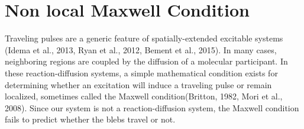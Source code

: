 \section{Non local Maxwell Condition}

Traveling pulses are a generic feature of spatially-extended excitable systems (Idema et al., 2013, Ryan et al., 2012, Bement et al., 2015). In many cases, neighboring regions are coupled by the diffusion of a molecular participant. In these reaction-diffusion systems, a simple mathematical condition exists for determining whether an excitation will induce a traveling pulse or remain localized, sometimes called the Maxwell condition(Britton, 1982, Mori et al., 2008). Since our system is not a reaction-diffusion system, the Maxwell condition fails to predict whether the blebs travel or not. 

